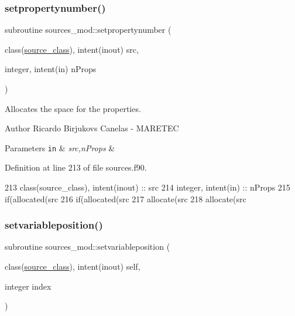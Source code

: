 \subsubsection{\texorpdfstring{setpropertynumber()}{setpropertynumber()}}
{\footnotesize\ttfamily subroutine sources\+\_\+mod\+::setpropertynumber (\begin{DoxyParamCaption}\item[{class(\mbox{\hyperlink{structsources__mod_1_1source__class}{source\+\_\+class}}), intent(inout)}]{src,  }\item[{integer, intent(in)}]{n\+Props }\end{DoxyParamCaption})\hspace{0.3cm}{\ttfamily [private]}}



Allocates the space for the properties. 

\begin{DoxyAuthor}{Author}
Ricardo Birjukovs Canelas -\/ M\+A\+R\+E\+T\+EC 
\end{DoxyAuthor}

\begin{DoxyParams}[1]{Parameters}
\mbox{\tt in}  & {\em src,n\+Props} & \\
\hline
\end{DoxyParams}


Definition at line 213 of file sources.\+f90.


\begin{DoxyCode}
213     \textcolor{keywordtype}{class}(source\_class), \textcolor{keywordtype}{intent(inout)} :: src
214     \textcolor{keywordtype}{integer}, \textcolor{keywordtype}{intent(in)} :: nProps
215     \textcolor{keywordflow}{if}(\textcolor{keyword}{allocated}(src%
216     \textcolor{keywordflow}{if}(\textcolor{keyword}{allocated}(src%
217     \textcolor{keyword}{allocate}(src%
218     \textcolor{keyword}{allocate}(src%
\end{DoxyCode}
\mbox{\label{namespacesources__mod_ace7df80935a9daf416ecebad865f6b69}} 
\subsubsection{\texorpdfstring{setvariableposition()}{setvariableposition()}}
{\footnotesize\ttfamily subroutine sources\+\_\+mod\+::setvariableposition (\begin{DoxyParamCaption}\item[{class(\mbox{\hyperlink{structsources__mod_1_1source__class}{source\+\_\+class}}), intent(inout)}]{self,  }\item[{integer}]{index }\end{DoxyParamCaption})\hspace{0.3cm}{\ttfamily [private]}}



